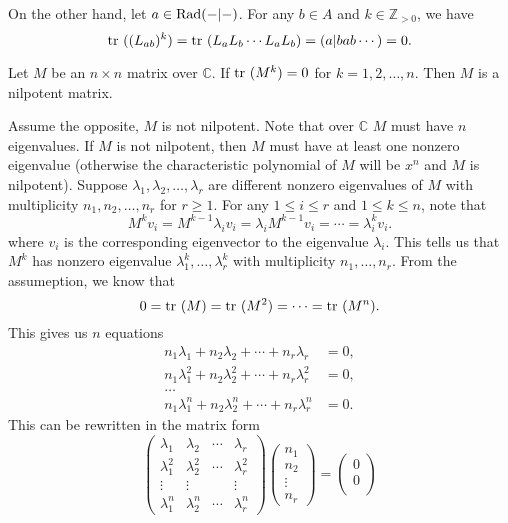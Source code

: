 \documentclass[a4paper, 12pt]{article}
\begin{document}
\begin{solution}
\begin{enumerate}[(1)]
On the other hand, let \(a\in \text{Rad}(-|-)\). For any \(b\in A\) and \(k\in \mathbb{Z}_{>0}\), we have 
\[\text{tr}\ ((L_{ab})^k)=\text{tr}\ (L_aL_b\cdots L_aL_b)=(a|bab\cdots)=0.\]
\begin{claim}
Let \(M\) be an \(n\times n\) matrix over \(\mathbb{C}\). If \(\text{tr}\ (M^k)=0\) for \(k=1,2,\ldots,n\). Then \(M\) is a nilpotent matrix.
\end{claim}
\begin{claimproof}
Assume the opposite, \(M\) is not nilpotent. Note that over \(\mathbb{C}\) \(M\) must have \(n\) eigenvalues. If \(M\) is not nilpotent, then \(M\) must have at least one nonzero eigenvalue (otherwise the characteristic polynomial of \(M\) will be \(x^n\) and \(M\) is nilpotent). Suppose 
\(\lambda_1,\lambda_2,\ldots,\lambda_r\) are different nonzero eigenvalues of \(M\) with multiplicity \(n_1,n_2,\ldots,n_r\) for \(r\geq 1\). For any \(1\leq i\leq r\) and \(1\leq k\leq n\), note that 
\[M^kv_i=M^{k-1}\lambda_iv_i=\lambda_iM^{k-1}v_i=\cdots=\lambda_i^kv_i.\]
where \(v_i\) is the corresponding eigenvector to the eigenvalue \(\lambda_i\). This tells us that \(M^k\) has nonzero eigenvalue \(\lambda_1^k,\ldots,\lambda_r^k\) with multiplicity \(n_1,\ldots,n_r\). From the assumeption, we know that 
\[0=\text{tr}\ (M)=\text{tr}\ (M^2)=\cdots=\text{tr}\ (M^n).\]
This gives us \(n\) equations 
\begin{align*}
    n_1\lambda_1+n_2\lambda_2+\cdots +n_r\lambda_r&=0,\\
    n_1\lambda_1^2+n_2\lambda_2^2+\cdots+n_r\lambda_r^2&=0, \\
    \ldots\\ 
    n_1\lambda_1^n+n_2\lambda_2^n+\cdots+n_r\lambda_r^n&=0.
\end{align*}
This can be rewritten in the matrix form 
\[\begin{pmatrix}
    \lambda_1&\lambda_2&\cdots&\lambda_r\\ 
    \lambda_1^2&\lambda_2^2&\cdots&\lambda_r^2\\ 
    \vdots&\vdots&&\vdots\\ 
    \lambda_1^n&\lambda_2^n&\cdots&\lambda_r^n
\end{pmatrix}\begin{pmatrix}
    n_1\\ 
    n_2\\ 
    \vdots\\ 
    n_r
\end{pmatrix}=\begin{pmatrix}
    0\\ 
    0\\ 

\end{pmatrix}\]
\end{claimproof}
\end{enumerate}
\end{solution}
\end{document}

